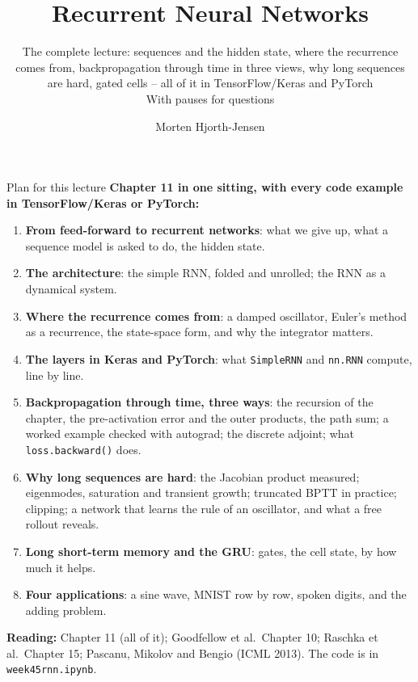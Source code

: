 \documentclass[10pt,aspectratio=169]{beamer}
\title{Recurrent Neural Networks}
\subtitle{The complete lecture: sequences and the hidden state, where the
  recurrence comes from, backpropagation through time in three views, why
  long sequences are hard, gated cells -- all of it in TensorFlow/Keras and
  PyTorch\\[3pt]
  \small With pauses for questions}
\author{Morten Hjorth-Jensen}
\institute{Department of Physics and Center for Computing in Science Education,\\
  University of Oslo, Norway}
\date{}
\begin{document}
\begin{frame}
\titlepage
\end{frame}

\begin{frame}{Plan for this lecture}
\small
\textbf{Chapter 11 in one sitting, with every code example in TensorFlow/Keras
or PyTorch:}
\begin{enumerate}
  \item \textbf{From feed-forward to recurrent networks}: what we give up,
        what a sequence model is asked to do, the hidden state.
  \item \textbf{The architecture}: the simple RNN, folded and unrolled; the
        RNN as a dynamical system.
  \item \textbf{Where the recurrence comes from}: a damped oscillator, Euler's
        method as a recurrence, the state-space form, and why the integrator
        matters.
  \item \textbf{The layers in Keras and PyTorch}: what \texttt{SimpleRNN} and
        \texttt{nn.RNN} compute, line by line.
  \item \textbf{Backpropagation through time, three ways}: the recursion of
        the chapter, the pre-activation error and the outer products, the
        path sum; a worked example checked with autograd; the discrete
        adjoint; what \texttt{loss.backward()} does.
  \item \textbf{Why long sequences are hard}: the Jacobian product measured;
        eigenmodes, saturation and transient growth; truncated BPTT in
        practice; clipping; a network that learns the rule of an oscillator,
        and what a free rollout reveals.
  \item \textbf{Long short-term memory and the GRU}: gates, the cell state, by
        how much it helps.
  \item \textbf{Four applications}: a sine wave, MNIST row by row, spoken
        digits, and the adding problem.
\end{enumerate}
\textbf{Reading:} Chapter 11 (all of it); Goodfellow et al.\ Chapter 10;
Raschka et al.\ Chapter 15; Pascanu, Mikolov and Bengio (ICML 2013).  The
code is in \texttt{week45rnn.ipynb}.
\end{frame}

\end{document}
